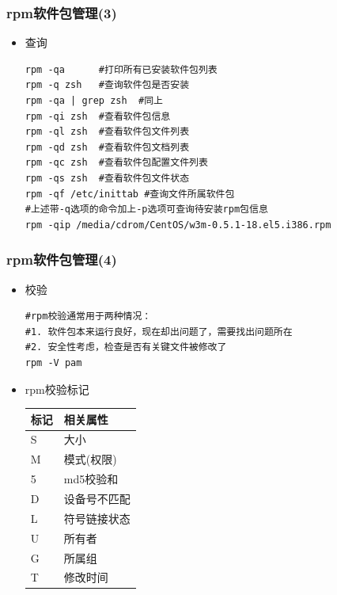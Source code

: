 \documentclass[xcolor=svgnames,presentation]{beamer}
\begin{document}
\begin{frame}[fragile]
\frametitle{rpm软件包管理(3)}
\label{sec-3-3}
\begin{itemize}

\item 查询\\
\label{sec-3-3-1}%
\begin{verbatim}
rpm -qa      #打印所有已安装软件包列表
rpm -q zsh   #查询软件包是否安装
rpm -qa | grep zsh  #同上
rpm -qi zsh  #查看软件包信息
rpm -ql zsh  #查看软件包文件列表
rpm -qd zsh  #查看软件包文档列表
rpm -qc zsh  #查看软件包配置文件列表
rpm -qs zsh  #查看软件包文件状态
rpm -qf /etc/inittab #查询文件所属软件包
#上述带-q选项的命令加上-p选项可查询待安装rpm包信息
rpm -qip /media/cdrom/CentOS/w3m-0.5.1-18.el5.i386.rpm
\end{verbatim}
\end{itemize} %
\end{frame}
\begin{frame}[fragile]
\frametitle{rpm软件包管理(4)}
\label{sec-3-4}
\begin{itemize}

\item 校验\\
\label{sec-3-4-1}%
\begin{verbatim}
#rpm校验通常用于两种情况：
#1. 软件包本来运行良好，现在却出问题了，需要找出问题所在
#2. 安全性考虑，检查是否有关键文件被修改了
rpm -V pam
\end{verbatim}

\item rpm校验标记\\
\label{sec-3-4-2}%
\begin{center}
\begin{tabular}{ll}
 标记  &  相关属性      \\
\hline
 S     &  大小          \\
 M     &  模式(权限)    \\
 5     &  md5校验和     \\
 D     &  设备号不匹配  \\
 L     &  符号链接状态  \\
 U     &  所有者        \\
 G     &  所属组        \\
 T     &  修改时间      \\
\end{tabular}
\end{center}


\end{itemize} %
\end{frame}
\end{document}
